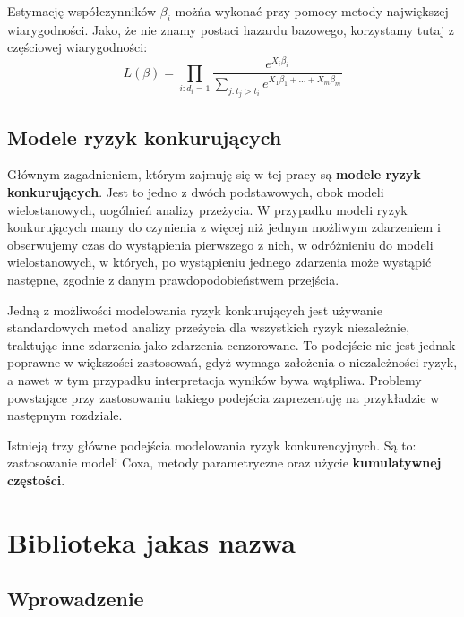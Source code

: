 \documentclass[]{pracamgr}
\begin{document}
Estymację współczynników $\beta_i$ możńa wykonać przy pomocy metody największej wiarygodności. Jako, że nie znamy postaci hazardu bazowego, korzystamy tutaj z częściowej wiarygodności:
\begin{equation}
L(\beta) = \prod_{i: d_{i} = 1} \frac{e^{X_{i}\beta_{i}}}{\sum_{j:t_{j}>t_{i}}e^{X_{1}\beta_{1}+...+X_{m}\beta_{m}}}
\end{equation}









\section{Modele ryzyk konkurujących}\label{comp risks}

Głównym zagadnieniem, którym zajmuję się w tej pracy są \textbf{modele ryzyk konkurujących}. Jest to jedno z dwóch podstawowych, obok modeli wielostanowych, uogólnień analizy przeżycia. W przypadku modeli ryzyk konkurujących mamy do czynienia z więcej niż jednym możliwym zdarzeniem i obserwujemy czas do wystąpienia pierwszego z nich, w odróżnieniu do modeli wielostanowych, w których, po wystąpieniu jednego zdarzenia może wystąpić następne, zgodnie z danym prawdopodobieństwem przejścia.

Jedną z możliwości modelowania ryzyk konkurujących jest używanie standardowych metod analizy przeżycia dla wszystkich ryzyk niezależnie, traktując inne zdarzenia jako zdarzenia cenzorowane. To podejście nie jest jednak poprawne w większości zastosowań, gdyż wymaga założenia o niezależności ryzyk, a nawet w tym przypadku interpretacja wyników bywa wątpliwa. Problemy powstające przy zastosowaniu takiego podejścia zaprezentuję na przykładzie w następnym rozdziale.

Istnieją trzy główne podejścia modelowania ryzyk konkurencyjnych. Są to: zastosowanie modeli Coxa, metody parametryczne oraz użycie \textbf{kumulatywnej częstości}. 




\chapter{Biblioteka jakas nazwa}\label{r:losers}

\section{Wprowadzenie}
\end{document}
